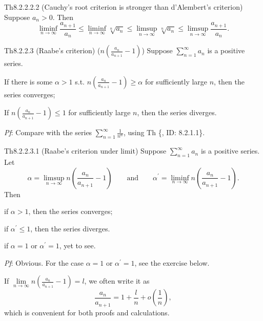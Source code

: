 \documentclass{article}
\begin{document}
\begin{Th}{Th8.2.2.2.2 (Cauchy's root criterion is stronger than d'Alembert's criterion)}
    Suppose $a_n>0$. Then
    $$ \liminf_{n\to\infty} \frac{a_{n+1}}{a_n} \leq \liminf_{n\to\infty} \sqrt[n]{a_n} \leq \limsup_{n\to\infty} \sqrt[n]{a_n} \leq \limsup_{n\to\infty} \frac{a_{n+1}}{a_n}. $$
\end{Th}

\begin{Th}{Th8.2.2.3 (Raabe's criterion) ($n(\frac{a_n}{a_{n+1}}-1)$)}
    Suppose $\sum_{n=1}^{\infty} a_n$ is a positive series. 
    \begin{compactenum}
        \item If there is some $\alpha>1$ s.t. $n(\frac{a_n}{a_{n+1}}-1) \geq \alpha$ for sufficiently large $n$, then the series converges;
        \item If $n\left(\frac{a_n}{a_{n+1}}-1\right) \leq 1$ for sufficiently large $n$, then the series diverges.
    \end{compactenum}
    \tcblower
    \textit{Pf}: Compare with the series $\sum_{n=1}^{\infty} \frac{1}{n^\alpha}$, using Th \{, ID: 8.2.1.1\}.
\end{Th}

\begin{Th}{Th8.2.2.3.1 (Raabe's criterion under limit)}
    Suppose $\sum_{n=1}^{\infty} a_n$ is a positive series. Let
    $$ \alpha = \limsup_{n\to\infty} n\left(\frac{a_n}{a_{n+1}}-1\right) \qquad \text{and} \qquad \alpha^\prime = \liminf_{n\to\infty} n\left(\frac{a_n}{a_{n+1}}-1\right). $$
    Then
    \begin{compactenum}
        \item if $\alpha > 1$, then the series converges;
        \item if $\alpha^\prime \leq 1$, then the series diverges.
        \item if $\alpha = 1$ or $\alpha^\prime = 1$, yet to see.
    \end{compactenum}
    \tcblower
    \textit{Pf}: Obvious. For the case $\alpha = 1$ or $\alpha^\prime = 1$, see the exercise below.
\end{Th}

\begin{Rmk}{}
    If $\lim\limits_{n\to\infty} n\left(\frac{a_n}{a_{n+1}}-1\right) = l$, we often write it as 
    $$ \frac{a_n}{a_{n+1}} = 1 + \frac{l}{n} + o\left(\frac{1}{n}\right), $$
    which is convenient for both proofs and calculations.
\end{Rmk}
\end{document}
